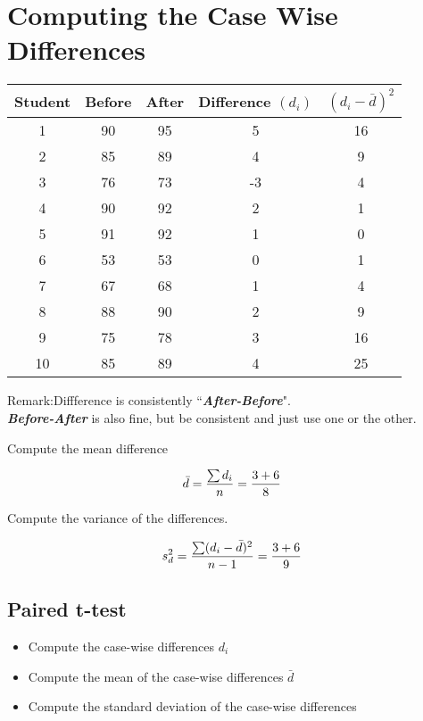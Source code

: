 \documentclass[a4paper,12pt]{article}
\begin{document}
\section{Computing the Case Wise Differences}
\begin{center}
\small
\begin{tabular}{|c||c|c|c|c|} \hline
Student & Before & After & Difference $(d_i)$ & $ (d_i -\bar{d})^2$ \\\hline
1 &90& 95& 5& 16 \\\hline
2 &85& 89& 4& 9 \\\hline
3 &76 &73 &-3 &4 \\\hline
4 &90& 92& 2& 1 \\\hline
5 &91 &92 &1 &0 \\\hline
6 &53 &53& 0& 1 \\\hline
7 &67 &68 &1 &4 \\\hline
8 &88 &90 &2 &9 \\\hline
9 &75 &78 &3 &16\\\hline
10 &85& 89 &4& 25 \\\hline
\end{tabular}
\end{center}





\smallskip
\noindent Remark:Diffference is consistently ``\textbf{\textit{After-Before}}". \\
\textbf{\textit{Before-After}} is also fine, but be consistent and just use one or the other.


Compute the mean difference

\[ \bar{d}  = {\sum{d_i} \over n } = { 3+6 \over 8} \]

Compute the variance of the differences.

\[ s^2_{d}  ={\sum(d_i -\bar{d})^2 \over n-1 } =  { 3+6 \over 9} \]











\subsection{Paired t-test}
\begin{framed}
\begin{itemize}
\item Compute the case-wise differences $d_i$
\item Compute the mean of the case-wise differences $\bar{d}$
\item Compute the standard deviation of the case-wise differences
\end{itemize}
\end{framed}
\end{document}
